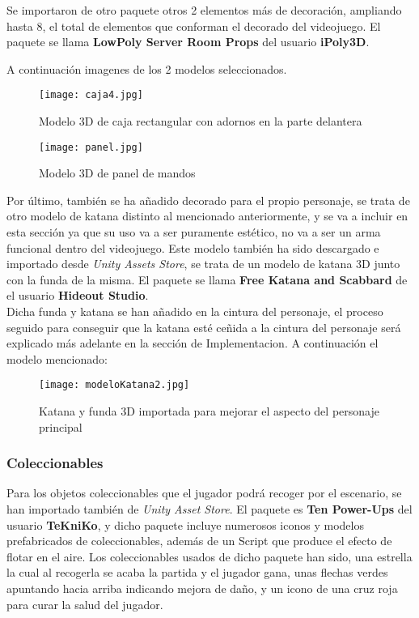 Se importaron de otro paquete otros 2 elementos más de decoración, ampliando hasta 8, el total de elementos que conforman el decorado del videojuego. El paquete se llama \textbf{LowPoly Server Room Props} del usuario \textbf{iPoly3D}.

A continuación imagenes de los 2 modelos seleccionados.

\begin{figure}[H]
    \centering
    \texttt{[image: caja4.jpg]}
    \caption{Modelo 3D de caja rectangular con adornos en la parte delantera}
\end{figure}

\begin{figure}[H]
    \centering
    \texttt{[image: panel.jpg]}
    \caption{Modelo 3D de panel de mandos}
\end{figure}

Por último, también se ha añadido decorado para el propio personaje, se trata de otro modelo de katana distinto al mencionado anteriormente, y se va a incluir en esta sección ya que su uso va a ser puramente estético, no va a ser un arma funcional dentro del videojuego. Este modelo también ha sido descargado e importado desde \textit{Unity Assets Store}, se trata de un modelo de katana 3D junto con la funda de la misma. El paquete se llama \textbf{Free Katana and Scabbard} de el usuario \textbf{Hideout Studio}.\\

Dicha funda y katana se han añadido en la cintura del personaje, el proceso seguido para conseguir que la katana esté ceñida a la cintura del personaje será explicado más adelante en la sección de Implementacion. A continuación el modelo mencionado:

\begin{figure}[H]
    \centering
    \texttt{[image: modeloKatana2.jpg]}
    \caption{Katana y funda 3D importada para mejorar el aspecto del personaje principal}
\end{figure}

\subsubsection{Coleccionables}

Para los objetos coleccionables que el jugador podrá recoger por el escenario, se han importado también de \textit{Unity Asset Store}. El paquete es \textbf{Ten Power-Ups} del usuario \textbf{TeKniKo}, y dicho paquete incluye numerosos iconos y modelos prefabricados de coleccionables, además de un Script que produce el efecto de flotar en el aire. Los coleccionables usados de dicho paquete han sido, una estrella la cual al recogerla se acaba la partida y el jugador gana, unas flechas verdes apuntando hacia arriba indicando mejora de daño, y un icono de una cruz roja para curar la salud del jugador.

